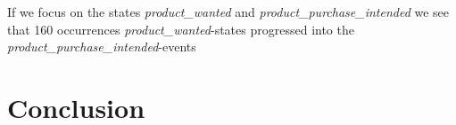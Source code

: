         If we focus on the states \emph{product\_wanted} and \emph{product\_purchase\_intended} we see that 160 occurrences \emph{product\_wanted}-states progressed into the \emph{product\_purchase\_intended}-events



















\section{Conclusion}
\label{sec:dataset-conclusion}



